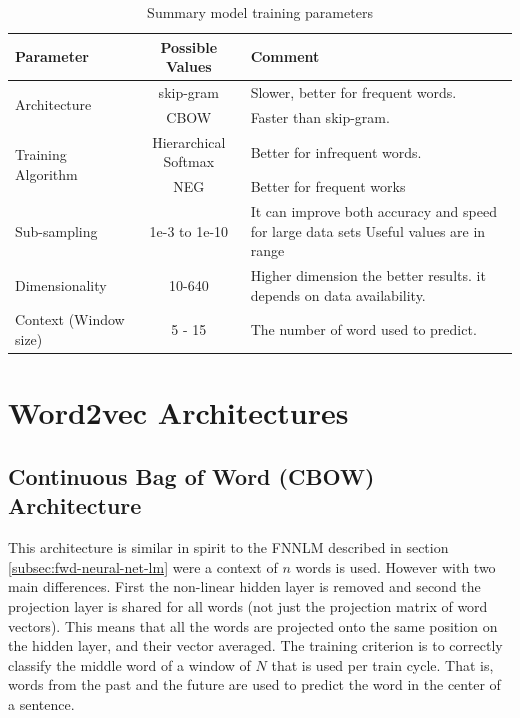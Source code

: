 \begin{table}[h]
   \centering
   \caption{Summary model training parameters} 
   \label{tab:word2_vec_parameters}
   
   \small
   \begin{tabular}{ |l|c|p{5cm}| }
   \hline           
    Parameter &  Possible Values & Comment \\  \hline           
    \multirow{2}{*}{Architecture}  & skip-gram  & Slower, better for frequent
    words. \\ 
    \cline{2-3}
    & \ac{CBOW}  &  Faster than skip-gram. \\ \hline
    \multirow{2}{*}{Training Algorithm}  & Hierarchical Softmax  & Better for infrequent words.   \\ 
    \cline{2-3}
    & \ac{NEG} & Better for frequent works \\ \hline
    Sub-sampling  & 1e-3 to 1e-10  &  It  can improve both accuracy and speed for large data
    sets Useful values are in range \\ \hline
    Dimensionality  & 10-640 & Higher dimension the better results. 
    it depends on data availability.  \\ \hline
    Context (Window size)  & 5 - 15 & The number of word used to predict. \\ \hline

    
\end{tabular}
\end{table}


\section{Word2vec Architectures}
\label{sec:word2v-architectures}


\subsection{Continuous Bag of Word (CBOW) Architecture}

This architecture is similar in spirit to the  \ac{FNNLM} described in section
\ref{subsec:fwd-neural-net-lm} were a context of $n$ words is used. However with two main differences. First the
non-linear hidden layer is removed and second the projection layer is shared for
all words (not just the projection matrix of word vectors). This means that
all the words are projected onto the same position on the hidden layer,  and their vector averaged.
The training criterion is to correctly classify the middle word of a window
of $N$ that is used per train cycle. That is, words from the past and the
future are used to predict the word in the center of a sentence. 


